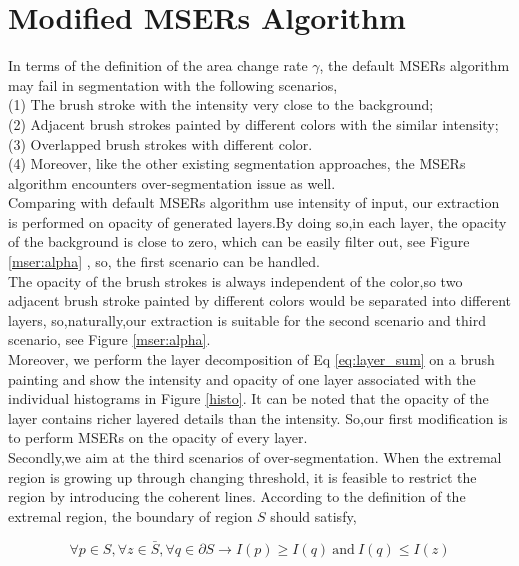 \section{Modified MSERs Algorithm}\label{modimesr}

In terms of the definition of the area change rate $ \gamma $, the default MSERs algorithm may fail in segmentation with the following scenarios,\\
(1) The brush stroke with the intensity very close to the background; \\
(2) Adjacent brush strokes painted by different colors with the similar intensity;\\
(3) Overlapped brush strokes with different color.\\ 
(4) Moreover, like the other existing segmentation approaches, the MSERs algorithm encounters over-segmentation issue as well. \\
Comparing with default MSERs algorithm use intensity of input, our extraction is performed on opacity of generated layers.By doing so,in each layer, the opacity of the background is close to zero, which can be easily filter out, see Figure \ref{mser:alpha} , so, the first scenario can be handled. \\
The opacity of the brush strokes is always independent of the color,so two adjacent brush stroke painted by different colors would be separated into different layers, so,naturally,our extraction is suitable for the second scenario and third scenario, see Figure \ref{mser:alpha}. \\
Moreover, we perform the layer decomposition of Eq \ref{eq:layer_sum} on a brush painting and show the intensity and opacity of one layer associated with the individual histograms in Figure \ref{histo}. It can be noted that the opacity of the layer contains richer layered details than the intensity. So,our first modification is to perform MSERs on the opacity of every layer.\\
Secondly,we aim at the third scenarios of over-segmentation. When the extremal region is growing up through changing threshold, it is feasible to restrict the region by introducing the coherent lines. According to the definition of the extremal region, the boundary of region $S$ should satisfy,

\begin{equation*}
 \forall p \in S,\forall z \in   \bar{S} , \forall q \in \partial S \longrightarrow I(p) \geq I(q)  ~\mathrm{and}~  I(q) \leq I(z)
\end{equation*}
 
